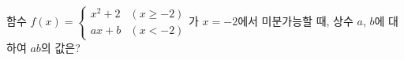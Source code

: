 함수 $f(x)=\begin{cases} x^2+2 & (x\ge -2) \\ ax+b & (x<-2) \end{cases}$가 $x=-2$에서 미분가능할 때, 상수 $a$, $b$에 대하여 $ab$의 값은?

